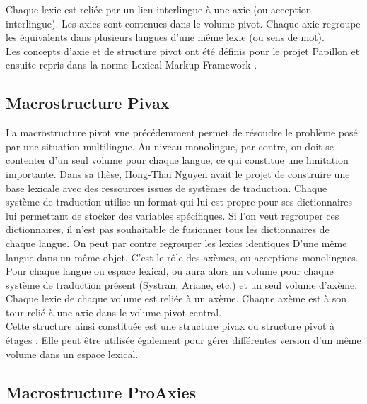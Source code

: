 \documentclass[10pt,a4paper,twoside]{article}
\begin{document}
Chaque lexie est reliée par un lien interlingue à une axie (ou acception interlingue). Les axies sont contenues dans le volume pivot. Chaque axie regroupe les équivalents dans plusieurs langues d'une même lexie (ou sens de mot). \\
Les concepts d'axie et de structure pivot ont été définis pour le projet Papillon et ensuite repris dans la norme Lexical Markup Framework \cite{Francopoulo09}.


\subsection{Macrostructure Pivax}

La macrostructure pivot vue précédemment permet de résoudre le problème posé par une situation multilingue. Au niveau monolingue, par contre, on doit se contenter d'un seul volume pour chaque langue, ce qui constitue une limitation importante. Dans sa thèse, Hong-Thai Nguyen \cite{HTN09} avait le projet de construire une base lexicale avec des ressources issues de systèmes de traduction. Chaque système de traduction utilise un format qui lui est propre pour ses dictionnaires lui permettant de stocker des variables spécifiques. Si l'on veut regrouper ces dictionnaires, il n'est pas souhaitable de fusionner tous les dictionnaires de chaque langue. On peut par contre regrouper les lexies identiques D'une même langue dans un même objet. C'est le rôle des axèmes, ou acceptions monolingues. \\

Pour chaque langue ou espace lexical, ou aura alors un volume pour chaque système de traduction présent (Systran, Ariane, etc.) et un seul volume d'axème. Chaque lexie de chaque volume est reliée à un axème. Chaque axème est à son tour relié à une axie dans le volume pivot central. \\
Cette structure ainsi constituée est une structure pivax ou structure pivot à étages \cite{MMHTN09}. Elle peut être utilisée également pour gérer différentes version d'un même volume dans un espace lexical.

\subsection{Macrostructure ProAxies}
\end{document}
